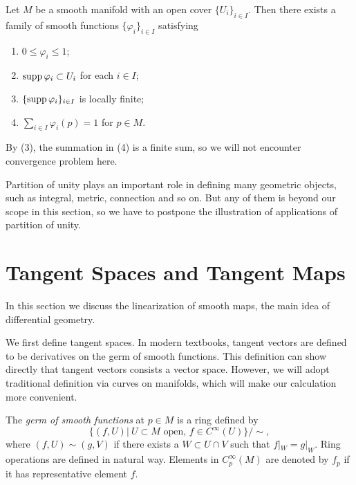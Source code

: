 \begin{thm}
    Let $M$ be a smooth manifold with an open cover $\{U_i\}_{i\in I}$.
    Then there exists a family of smooth functions $\{\varphi_i\}_{i\in I}$ satisfying
    \begin{enumerate}[(1)]
        \item $0\leq\varphi_i\leq 1$;
        \item $\operatorname{supp}\varphi_i\subset U_i$ for each $i\in I$;
        \item $\{\operatorname{supp}\varphi_i\}_{i\in I}$ is locally finite;
        \item $\sum_{i\in I}\varphi_i(p)=1$ for $p\in M$.
    \end{enumerate}
\end{thm}

\begin{rem}
    By (3), the summation in (4) is a finite sum, so we will not encounter convergence problem here.
\end{rem}

Partition of unity plays an important role in defining many geometric objects, such as integral, metric, connection and so on.
But any of them is beyond our scope in this section, so we have to postpone the illustration of applications of partition of unity.

\section{Tangent Spaces and Tangent Maps}

In this section we discuss the linearization of smooth maps, the main idea of differential geometry.

We first define tangent spaces.
In modern textbooks, tangent vectors are defined to be derivatives on the germ of smooth functions.
This definition can show directly that tangent vectors consists a vector space.
However, we will adopt traditional definition via curves on manifolds, which will make our calculation more convenient.

\begin{defn}
    The \emph{germ of smooth functions} at $p\in M$ is a ring defined by
    \[\{(f,U)|\ U\subset M\text{ open, }f\in C^\infty(U)\}/\sim,\]
    where $(f,U)\sim(g,V)$ if there exists a $W\subset U\cap V$ such that $f|_W=g|_W$.
    Ring operations are defined in natural way.
    Elements in $C^\infty_p(M)$ are denoted by $f_p$ if it has representative element $f$.
\end{defn}

